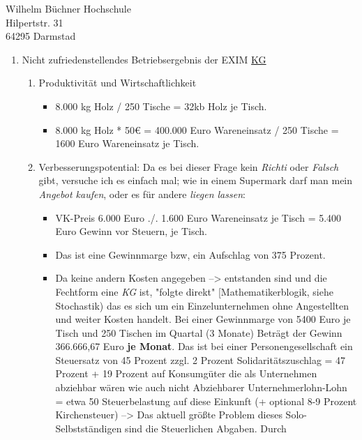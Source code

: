 \documentclass[
    version=last,           %
    DIV=13,                 %
    BCOR=0mm,               %
    paper=a4,               %
    fontsize=12pt,          %
    firsthead=on,           %
    firstfoot=on,           %
    pagenumber=on,i         %
    parskip=half,           %
    enlargefirstpage=,      %
    firsthead=on,           %
    fromrule=afteraddress,  %
    priority=off,           %
    backaddress=true,       %
    refline=dateright,      %
	fromalign=right,	    %
    fromemail=on,i          %
    fromurl=on,             %
    frombank=on,
    fromphone=on,           %
    frommobilephone=on      %
    fromlogo=on,            %
    addrfield=on,           %
    subject=untitled,  %
    foldmarks=off,          %
    numericaldate=off,      %
	pagenumber=right,	        %
	parskip=half,	        %
    headsep=false,          %
    footsepline=true,       %
    foldmarks=off,		    %
	]{scrlttr2}
\begin{document}
\begin{letter} {Wilhelm Büchner Hochschule \\
Hilpertstr. 31\\
64295 Darmstad}
\begin{enumerate}
    \item Nicht zufriedenstellendes Betriebsergebnis der EXIM \underline{KG}
        \begin{enumerate}
            \item Produktivität und Wirtschaftlichkeit
                \begin{itemize}
                    \item 8.000 kg Holz / 250 Tische = 32kb Holz je Tisch.
                    \item 8.000 kg Holz * 50€ = 400.000 Euro Wareneinsatz / 250
                        Tische = 1600 Euro Wareneinsatz je Tisch.
                \end{itemize}
            \item Verbesserungspotential:
                Da es bei dieser Frage kein \textit{Richti} oder \textit{Falsch}
                gibt, versuche ich es einfach mal; wie in einem Supermark darf
                man mein \textit{Angebot kaufen}, oder es für andere
                \textit{liegen lassen}:
                \begin{itemize}
                    \item VK-Preis 6.000 Euro ./. 1.600 Euro Wareneinsatz je
                        Tisch = 5.400 Euro Gewinn vor Steuern, je Tisch.
                    \item Das ist eine Gewinnmarge bzw, ein Aufschlag von 375
                        Prozent.
                    \item Da keine andern Kosten angegeben --> entstanden sind und die
                        Fechtform eine \textit{KG} ist, "folgte direkt"
                        [Mathematikerblogik, siehe Stochastik) das es sich um ein
                        Einzelunternehmen ohne Angestellten und weiter Kosten handelt. Bei
                        einer Gewinnmarge von 5400 Euro je Tisch und 250 Tischen im
                        Quartal (3 Monate) Beträgt der Gewinn 366.666,67 Euro \textbf{je
                        Monat}. Das ist bei einer Personengesellschaft ein Steuersatz von
                        45 Prozent zzgl. 2 Prozent Solidaritätszuschlag = 47 Prozent +
                        19 Prozent auf Konsumgüter die als Unternehmen abziehbar
                        wären wie auch  nicht Abziehbarer Unternehmerlohn-Lohn = etwa
                        50 Steuerbelastung auf diese Einkunft (+ optional 8-9 Prozent
                        Kirchensteuer) --> Das aktuell größte Problem dieses
                        Solo-Selbstständigen sind die Steuerlichen Abgaben. Durch

\end{itemize}
\end{enumerate}
\end{enumerate}
\end{letter}
\end{document}
